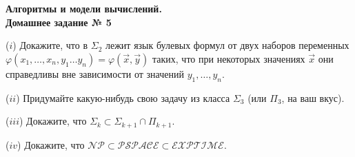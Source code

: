 \documentclass[a4paper,12pt]{article}
\begin{document}
	
	\thispagestyle{firstpage}
	
	\begin{center}
		\textbf{\Large{Алгоритмы и модели вычислений. \\ Домашнее задание № 5}}
	\end{center}
	
\begin{tasknum}{1}
	($i$) Докажите, что в $\Sigma_2$ лежит язык булевых формул от двух наборов переменных $\varphi(x_1,\dotsc, x_n, y_1\dotsc y_n) = \varphi(\vec{x}, \vec{y})$ таких, что при некоторых значениях $\vec{x}$ они справедливы вне зависимости от значений $y_1,\dotsc, y_n$.
	
	($ii$) Придумайте какую-нибудь свою задачу из класса $\Sigma_3$ (или $\Pi_3$, на ваш вкус).
	
	($iii$) Докажите, что $\Sigma_k \subset \Sigma_{k+1}\cap \Pi_{k+1}$.
	
	($iv$) Докажите, что $\mathcal{NP}\subset\mathcal{PSPACE}\subset\mathcal{EXPTIME}$.
\end{tasknum}
\end{document}
